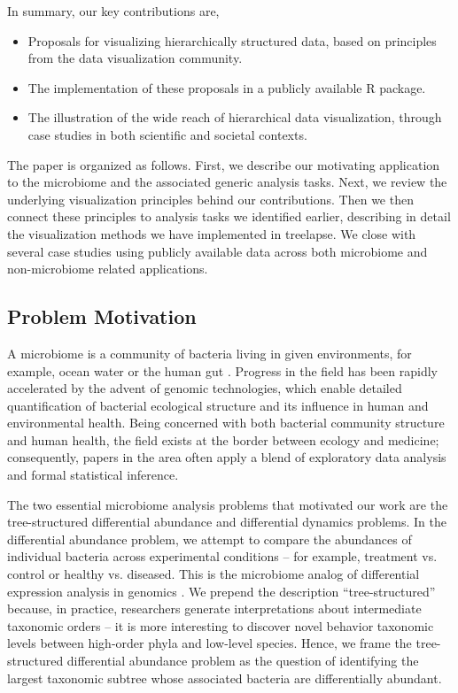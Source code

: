 In summary, our key contributions are,
\begin{itemize}
\item Proposals for visualizing hierarchically structured data, based on
  principles from the data visualization community.
\item The implementation of these proposals in a publicly available R package.
\item The illustration of the wide reach of hierarchical data visualization,
  through case studies in both scientific and societal contexts.
\end{itemize}

The paper is organized as follows. First, we describe our motivating application
to the microbiome and the associated generic analysis tasks. Next, we review the
underlying visualization principles behind our contributions. Then we then
connect these principles to analysis tasks we identified earlier, describing in
detail the visualization methods we have implemented in treelapse. We close with
several case studies using publicly available data across both microbiome and
non-microbiome related applications.

\subsection{Problem Motivation}\label{problem-motivation}

A microbiome is a community of bacteria living in given environments, for
example, ocean water or the human gut \citep{human2012structure, cho2012human}.
Progress in the field has been rapidly accelerated by the advent of genomic
technologies, which enable detailed quantification of bacterial ecological
structure and its influence in human and environmental health. Being concerned
with both bacterial community structure and human health, the field exists at
the border between ecology and medicine; consequently, papers in the area often
apply a blend of exploratory data analysis and formal statistical inference.

The two essential microbiome analysis problems that motivated our work are the
tree-structured differential abundance and differential dynamics problems. In
the differential abundance problem, we attempt to compare the abundances of
individual bacteria across experimental conditions -- for example, treatment vs.
control or healthy vs. diseased. This is the microbiome analog of differential
expression analysis in genomics \citep{anders2010differential}. We prepend the
description ``tree-structured'' because, in practice, researchers generate
interpretations about intermediate taxonomic orders -- it is more interesting to
discover novel behavior taxonomic levels between high-order phyla and low-level
species. Hence, we frame the tree-structured differential abundance problem as
the question of identifying the largest taxonomic subtree whose associated
bacteria are differentially abundant.

